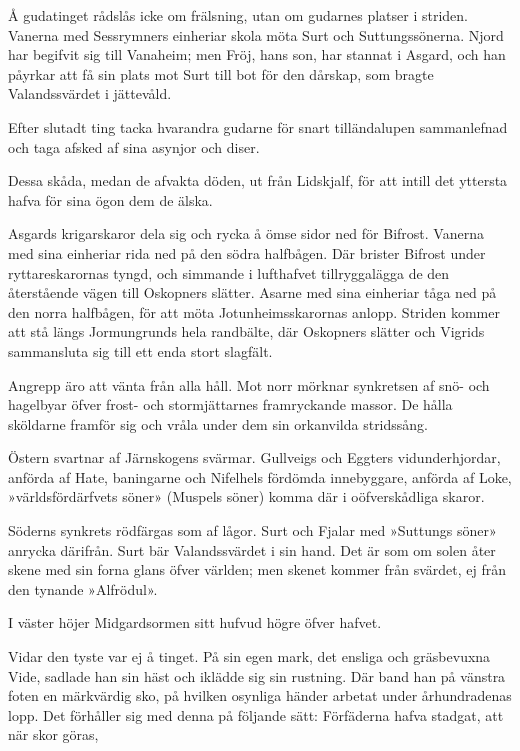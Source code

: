 Å gudatinget rådslås icke om frälsning, utan om gudarnes platser i
striden. Vanerna med Sessrymners einheriar skola möta Surt och
Suttungssönerna. Njord har begifvit sig till Vanaheim; men Fröj, hans
son, har stannat i Asgard, och han påyrkar att få sin plats mot Surt
till bot för den dårskap, som bragte Valandssvärdet i jättevåld.



Efter slutadt ting tacka hvarandra gudarne för snart tilländalupen
sammanlefnad och taga afsked af sina asynjor och diser.

Dessa skåda, medan de afvakta döden, ut från Lidskjalf, för att intill
det yttersta hafva för sina ögon dem de älska.

Asgards krigarskaror dela sig och rycka å ömse sidor ned för Bifrost.
Vanerna med sina einheriar rida ned på den södra halfbågen. Där brister
Bifrost under ryttareskarornas tyngd, och simmande i lufthafvet
tillryggalägga de den återstående vägen till Oskopners slätter. Asarne
med sina einheriar tåga ned på den norra halfbågen, för att möta
Jotunheimsskarornas anlopp. Striden kommer att stå längs Jormungrunds
hela randbälte, där Oskopners slätter och Vigrids sammansluta sig till
ett enda stort slagfält.

Angrepp äro att vänta från alla håll. Mot norr mörknar synkretsen af
snö- och hagelbyar öfver frost- och stormjättarnes framryckande massor.
De hålla sköldarne framför sig och vråla under dem sin orkanvilda
stridssång.

Östern svartnar af Järnskogens svärmar. Gullveigs och Eggters
vidunderhjordar, anförda af Hate, baningarne och Nifelhels fördömda
innebyggare, anförda af Loke, »världsfördärfvets söner» (Muspels söner)
komma där i oöfverskådliga skaror.

Söderns synkrets rödfärgas som af lågor. Surt och Fjalar med »Suttungs
söner» anrycka därifrån. Surt bär Valandssvärdet i sin hand. Det är som
om solen åter skene med sin forna glans öfver världen; men skenet kommer
från svärdet, ej från den tynande »Alfrödul».

I väster höjer Midgardsormen sitt hufvud högre öfver hafvet.

Vidar den tyste var ej å tinget. På sin egen mark, det ensliga och
gräsbevuxna Vide, sadlade han sin häst och iklädde sig sin rustning. Där
band han på vänstra foten en märkvärdig sko, på hvilken osynliga händer
arbetat under århundradenas lopp. Det förhåller sig med denna på
följande sätt: Förfäderna hafva stadgat, att när skor göras,

